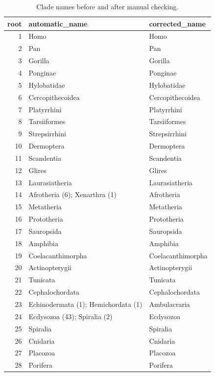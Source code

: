 \begin{table}[H]

\caption{\label{tab:unnamed-chunk-6}Clade names before and after manual checking.}
\begin{tabular}[t]{rll}
\toprule
root & automatic\_name & corrected\_name\\
\midrule
\rowcolor{gray!6}  1 & Homo & Homo\\
2 & Pan & Pan\\
\rowcolor{gray!6}  3 & Gorilla & Gorilla\\
4 & Ponginae & Ponginae\\
\rowcolor{gray!6}  5 & Hylobatidae & Hylobatidae\\
6 & Cercopithecoidea & Cercopithecoidea\\
\rowcolor{gray!6}  7 & Platyrrhini & Platyrrhini\\
8 & Tarsiiformes & Tarsiiformes\\
\rowcolor{gray!6}  9 & Strepsirrhini & Strepsirrhini\\
10 & Dermoptera & Dermoptera\\
\rowcolor{gray!6}  11 & Scandentia & Scandentia\\
12 & Glires & Glires\\
\rowcolor{gray!6}  13 & Laurasiatheria & Laurasiatheria\\
14 & Afrotheria (6); Xenarthra (1) & Afrotheria\\
\rowcolor{gray!6}  15 & Metatheria & Metatheria\\
16 & Prototheria & Prototheria\\
\rowcolor{gray!6}  17 & Sauropsida & Sauropsida\\
18 & Amphibia & Amphibia\\
\rowcolor{gray!6}  19 & Coelacanthimorpha & Coelacanthimorpha\\
20 & Actinopterygii & Actinopterygii\\
\rowcolor{gray!6}  21 & Tunicata & Tunicata\\
22 & Cephalochordata & Cephalochordata\\
\rowcolor{gray!6}  23 & Echinodermata (1); Hemichordata (1) & Ambulacraria\\
24 & Ecdysozoa (43); Spiralia (2) & Ecdysozoa\\
\rowcolor{gray!6}  25 & Spiralia & Spiralia\\
26 & Cnidaria & Cnidaria\\
\rowcolor{gray!6}  27 & Placozoa & Placozoa\\
28 & Porifera & Porifera\\

\end{tabular}
\end{table}

